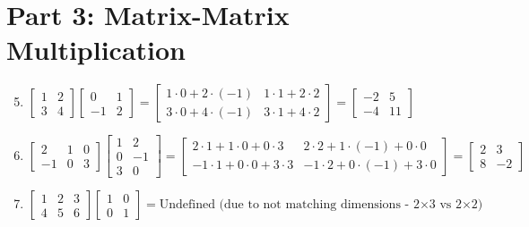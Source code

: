 \documentclass{article}
\begin{document}
\section*{Part 3: Matrix-Matrix Multiplication}
\begin{enumerate}
\setcounter{enumi}{4}
\item $\begin{bmatrix} 1 & 2 \\ 3 & 4 \end{bmatrix} \begin{bmatrix} 0 & 1 \\ -1 & 2 \end{bmatrix} = \begin{bmatrix} 1\cdot0+2\cdot(-1) & 1\cdot1+2\cdot2 \\ 3\cdot0+4\cdot(-1) & 3\cdot1+4\cdot2 \end{bmatrix} = \boxed{\begin{bmatrix} -2 & 5 \\ -4 & 11 \end{bmatrix}}$

\item $\begin{bmatrix} 2 & 1 & 0 \\ -1 & 0 & 3 \end{bmatrix} \begin{bmatrix} 1 & 2 \\ 0 & -1 \\ 3 & 0 \end{bmatrix} = \begin{bmatrix} 2\cdot1+1\cdot0+0\cdot3 & 2\cdot2+1\cdot(-1)+0\cdot0 \\ -1\cdot1+0\cdot0+3\cdot3 & -1\cdot2+0\cdot(-1)+3\cdot0 \end{bmatrix} = \boxed{\begin{bmatrix} 2 & 3 \\ 8 & -2 \end{bmatrix}}$
	
\item $\begin{bmatrix} 1 & 2 & 3 \\ 4 & 5 & 6 \end{bmatrix} \begin{bmatrix} 1 & 0 \\ 0 & 1 \end{bmatrix} = \boxed{\text{Undefined (due to not matching dimensions - 2×3 vs 2×2)}}$
\end{enumerate}
\end{document}
